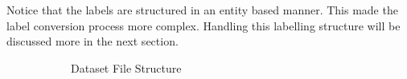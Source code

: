  Notice that the labels are structured in an entity based manner. This made the label conversion process
  more complex. Handling this labelling structure will be discussed more in the next section.
  \begin{figure}
    \centering
    \begin{subfigure}[][][t]{.57\textwidth}
      \label{fig:filestructure}
      \caption{Dataset File Structure}
    \end{subfigure}\hfill
    \begin{subfigure}[][][t]{.37\textwidth}

\end{subfigure}
\end{figure}
